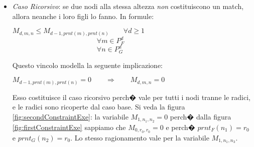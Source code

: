 \begin{itemize}
\begin{figure*}[th]
	\caption{Esempio per il primo vincolo \label{fig:firstConstraintExe}}
	\end{figure*}
	Si noti che questo vincolo viene applicato a tutti i nodi tranne ai siti, come specificato dalla condizione $\forall d\leq depth - 1$.
	
	\item
	\emph{Caso Ricorsivo}:  se due nodi alla stessa altezza \emph{non} costituiscono un match, allora neanche i loro figli lo fanno. In formule:
	\begin{center}
	$M_{d,m,n} \le M_{d-1,prnt(m), prnt(n)} \qquad \forall d \ge 1\qquad \qquad$ \\ $\qquad \qquad \qquad \qquad \qquad \qquad \forall m \in P_F^d$ \\ $\qquad \qquad \qquad \qquad \qquad \qquad 	\forall n \in P_G^d$
	\end{center}
	Questo vincolo modella la seguente implicazione: 
	\begin{center}
	$M_{d-1,prnt(m), prnt(n)}=0 \qquad \Rightarrow \qquad M_{d,m,n}=0$
	\end{center}
	Esso costituisce il caso ricorsivo perch� vale per tutti i nodi tranne le radici, e le radici sono ricoperte dal caso base. Si veda la figura \ref{fig:secondConstraintExe}: la variabile 
	$M_{1,n_1,n_2}=0$ perch� dalla figura \ref{fig:firstConstraintExe} sappiamo che $M_{0,r_0,r_0}=0$ e perch� $prnt_F(n_1)=r_0$ e $prnt_G(n_2)=r_0$. Lo stesso ragionamento vale per la variabile $M_{1,n_1,n_3}$.
	
	
		
	\begin{figure*}[th]
	\centering
\end{figure*}
\end{itemize}
